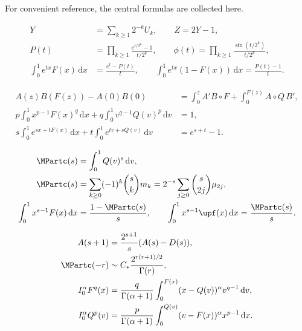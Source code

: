 \documentclass[11pt,oneside]{article}
\theoremstyle{definition}
\theoremstyle{remark}
\newcommand{\F}{F}
\newcommand{\Q}{Q}
\newcommand{\dd}{\,\mathrm d}
\newcommand{\1}{\mathbf 1}
\begin{document}
For convenient reference, the central formulas are collected here.

\begin{resultbox}
\begin{align*}
 Y&=\sum_{k\ge1}2^{-k}U_k,\qquad Z=2Y-1,\\
 P(t)&=\prod_{k\ge1}\frac{e^{t/2^k}-1}{t/2^k},\qquad
 \phi(t)=\prod_{k\ge1}\frac{\sin(t/2^k)}{t/2^k},\\
 \int_0^1e^{tx}\F(x)\dd x&=\frac{e^t-P(t)}t,\qquad
 \int_0^1e^{tx}(1-\F(x))\dd x=\frac{P(t)-1}t.
\end{align*}
\end{resultbox}

\begin{resultbox}
\begin{align*}
 A(z)B(\F(z))-A(0)B(0)
 &=\int_0^zA'B\circ\F
 +\int_0^{\F(z)}A\circ\Q\,B',\\
 p\int_0^1x^{p-1}\F(x)^q\dd x
 +q\int_0^1v^{q-1}\Q(v)^p\dd v&=1,\\
 s\int_0^1e^{sx+t\F(x)}\dd x
 +t\int_0^1e^{tv+s\Q(v)}\dd v&=e^{s+t}-1.
\end{align*}
\end{resultbox}

\begin{resultbox}
\begin{align*}
 \MPartc(s)&=\int_0^1\Q(v)^s\dd v,\\
 \MPartc(s)&=\sum_{k\ge0}(-1)^k\binom skm_k
 =2^{-s}\sum_{j\ge0}\binom{s}{2j}\mu_{2j},\\
 \int_0^1x^{s-1}\F(x)\dd x&=\frac{1-\MPartc(s)}s,\qquad
 \int_0^1x^{s-1}\upf(x)\dd x=\frac{\MPartc(s)}s.
\end{align*}
\end{resultbox}

\begin{resultbox}
\begin{align*}
 A(s+1)&=\frac{2^{s+1}}s(A(s)-D(s)),\\
 \MPartc(-r)&\sim C_*\frac{2^{r(r+1)/2}}{\Gamma(r)},\\
 I_0^\alpha\F^q(x)
 &=\frac{q}{\Gamma(\alpha+1)}
 \int_0^{\F(x)}(x-\Q(v))^\alpha v^{q-1}\dd v,\\
 I_0^\alpha\Q^p(v)
 &=\frac{p}{\Gamma(\alpha+1)}
 \int_0^{\Q(v)}(v-\F(x))^\alpha x^{p-1}\dd x.
\end{align*}
\end{resultbox}
\end{document}

